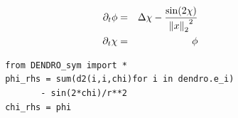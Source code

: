 \documentclass[landscape]{a0poster}
\begin{document}
\begin{textblock}{32}
\begin{textblock}{14}
		\begin{figure}
			\begin{minipage}[t]{.48\textwidth}
				\begin{eqnarray*}
				\partial_t\phi &=& \Delta \chi -\frac{\sin(2\chi)}{{\left\lVert x\right\rVert_2}^2} \\
				\partial_t\chi &=& \phi 
				\end{eqnarray*}
			\end{minipage}%
		\begin{minipage}[t]{.5\textwidth}
			\small
\begin{verbatim}
 from DENDRO_sym import *
 phi_rhs = sum(d2(i,i,chi)for i in dendro.e_i) 
 		- sin(2*chi)/r**2
 chi_rhs = phi
\end{verbatim}
		\end{minipage}
		\vspace{-0.15in}
	\end{figure}
	\vspace{0.7in}
	

\end{textblock}
\end{textblock}
\end{document}

